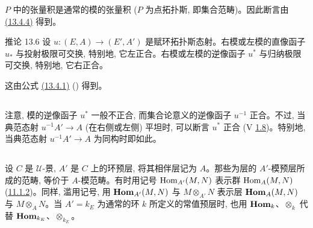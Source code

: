 $P$ 中的张量积是通常的模的张量积 ($P$ 为点拓扑斯, 即集合范畴)。因此断言由 \hyperlink{sga4.exp.IV.equation.13.4.4}{(13.4.4)} 得到。

\begin{enonce*}{推论 13.6}
设 $u:(E,A)\rightarrow(E',A')$ 是赋环拓扑斯态射。右模或左模的直像函子 $u_{\ast}$ 与投射极限可交换, 特别地, 它左正合。右模或左模的逆像函子 $u^{\ast}$ 与归纳极限可交换, 特别地, 它右正合。
\end{enonce*}

这由公式 \hyperlink{sga4.exp.IV.equation.13.4.1}{(13.4.1)} () 得到。

\setcounter{subsection}{6}
\subsection{}
注意, 模的逆像函子 $u^{\ast}$ 一般不正合, 而集合论意义的逆像函子 $u^{-1}$ 正合。不过, 当典范态射 $u^{-1}A'\rightarrow A$ (在右侧\pageoriginale 或左侧) 平坦时, 可以断言 $u^{\ast}$ 正合 (V \hyperref[V.def1.8]{1.8})。特别地, 当典范态射 $u^{-1}A'\rightarrow A$ 为同构时即如此。

\subsection{}
设 $C$ 是 $𝒰$-景, $A'$ 是 $C$ 上的环预层, 将其相伴层记为 $A$。那些为层的 $A'$-模预层所成的范畴, 等价于 $A$-模范畴。有时用记号 $\operatorname{Hom}_{A'}(M,N)$ 表示群 $\operatorname{Hom}_A(M,N)$ (\hyperref[IV.subsubsec11.1.2]{11.1.2})。同样, 滥用记号, 用 $\operatorname{\mathbf{Hom}}_{A'}(M,N)$ 与 $M\otimes_{A'}N$ 表示层 $\operatorname{\mathbf{Hom}}_A(M,N)$ 与 $M\otimes_A N$。当 $A'=k_E$ 为通常的环 $k$ 所定义的常值预层时, 也用 $\operatorname{\mathbf{Hom}}_k$、$\otimes_k$ 代替 $\operatorname{\mathbf{Hom}}_{k_E}$、$\otimes_{k_E}$。

